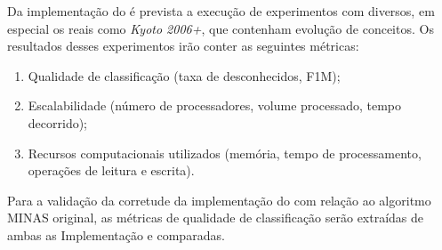 
Da implementação do \mfog é prevista a execução de experimentos com \datasets
diversos, em especial os \datasets reais como \emph{Kyoto 2006+},
que contenham evolução de conceitos.
Os resultados desses experimentos irão conter as seguintes métricas:

\begin{enumerate}[label={\alph*)}]
  \item Qualidade de classificação (taxa de desconhecidos, F1M);
  \item Escalabilidade (número de processadores, volume processado, tempo
  decorrido);
  \item Recursos computacionais utilizados (memória, tempo de processamento,
  operações de leitura e escrita).
\end{enumerate}

Para a validação da corretude da implementação do \mfog com relação ao algoritmo
MINAS original, as métricas de qualidade de classificação serão extraídas de
ambas as Implementação e comparadas.
